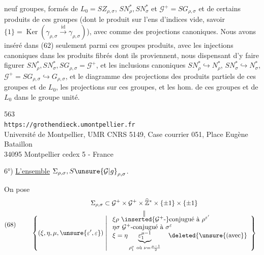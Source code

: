 
neuf groupes,  formés de $L_{0}=SZ_{\rho,\sigma}$, $SN_{\rho}^{*},SN_{\sigma}^{*}$ et $\mathcal{G}^{+}=SG_{\rho,\sigma}$ et de certains produits de ces groupes (dont le produit sur l'ens d'indices vide, savoir $\{1\}=\operatorname{Ker}(\gamma_{\rho,\sigma}\xrightarrow{\mathrm{id}}\gamma_{\rho,\sigma})$), avec comme  des projections canoniques. Nous avons inséré dans (62) seulement  parmi ces groupes produits, avec les injections canoniques dans les produits fibrés dont ils proviennent,  nous dispensant d'y faire figurer  $SN_{\rho}^{*},SN_{\sigma}^{*},SG_{\rho,\sigma}=\mathcal{G}^{+}$, et les inclusions canoniques $SN_{\rho}^{*}\hookrightarrow N_{\rho}^{*}$, $SN_{\sigma}^{*}\hookrightarrow N_{\sigma}^{*}$, $\mathcal{G}^{+}=SG_{\rho,\sigma}\hookrightarrow G_{\rho,\sigma}$, et le  diagramme  des projections des produits partiels de ces groupes et de $L_{0}$,   les projections sur ces  groupes, et les hom. de ces groupes et de $L_{0}$ dans le groupe unité.


{\small
\begin{center}
563\\
\texttt{https://grothendieck.umontpellier.fr}\\
Université de Montpellier, UMR CNRS 5149, Case courrier 051, Place Eugène Bataillon\\
34095 Montpellier cedex 5 - France
\end{center}
}


6°) \uline{L'ensemble} $\Sigma_{\rho,\sigma},S\unsure{\mathcal{G}|g}_{\rho,\sigma}$.

On pose
\[
\text{(68)}\qquad
\begin{gathered}
\Sigma_{\rho,\sigma}\subset\mathcal{G}^{+}\times\mathcal{G}^{+}\times\widehat{\mathbb Z}^{*}\times\{\pm1\}\times\{\pm1\}\\
\begin{array}{c}
\Vert\\[-0.4em]
\displaystyle
\left\{(\xi,\eta,\mu,\unsure{\varepsilon',\varepsilon})\;\middle|\;
\begin{array}{l}
\xi\rho\ \inserted{\mathcal{G}^{+}\text{-}}\text{conjugué à }\rho^{\varepsilon'}\\
\eta\sigma\ \mathcal{G}^{+}\text{-conjugué à }\sigma^{\varepsilon}\\
\xi=\eta\underbrace{\varepsilon_{1}^{\mu-1}}_{\rho_{1}^{\nu}\ \text{où }\nu=\frac{\mu-1}{2}}\quad\deleted{\unsure{\text{(avec}}}
\end{array}\right\}
\end{array}
\end{gathered}
\]

